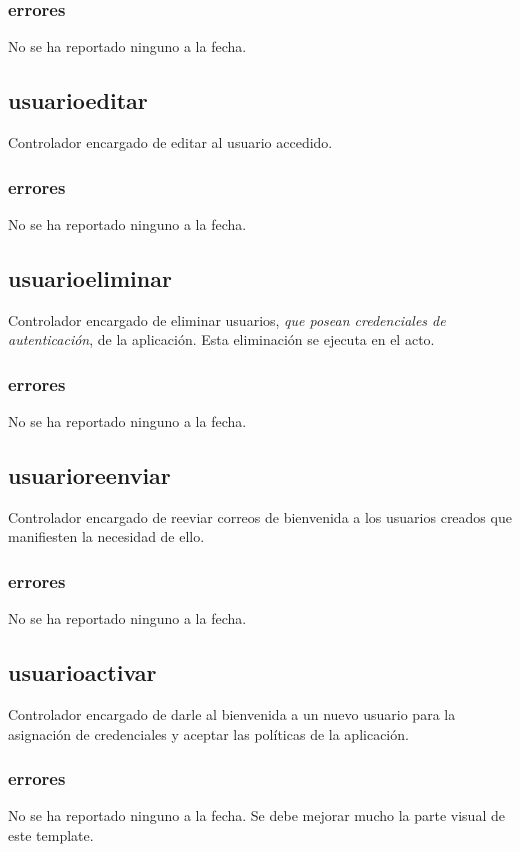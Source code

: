 \documentclass[10pt,a4paper]{book}
\begin{document}
	\subsubsection{errores}
	No se ha reportado ninguno a la fecha.
	
	\subsection{usuarioeditar}
	Controlador encargado de editar al usuario accedido.
	\subsubsection{errores}
	No se ha reportado ninguno a la fecha.

	\subsection{usuarioeliminar}
	Controlador encargado de eliminar usuarios, \textit{que posean credenciales de autenticación}, de la aplicación. Esta eliminación se ejecuta en el acto.
	\subsubsection{errores}
	No se ha reportado ninguno a la fecha.

	\subsection{usuarioreenviar}
	Controlador encargado de reeviar correos de bienvenida a los usuarios creados que manifiesten la necesidad de ello.
	\subsubsection{errores}
	No se ha reportado ninguno a la fecha.

	\subsection{usuarioactivar}
	Controlador encargado de darle al bienvenida a un nuevo usuario para la asignación de credenciales y aceptar las políticas de la aplicación.
	\subsubsection{errores}
	No se ha reportado ninguno a la fecha. Se debe mejorar mucho la parte visual de este template.
	
\end{document}
